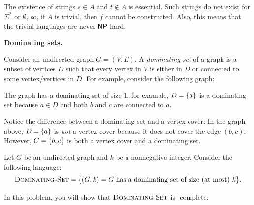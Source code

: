 \documentclass[11pt,addpoints,answers]{exam}
\begin{document}
\begin{questions}
\begin{parts}
\begin{solution}
  The existence of strings \(s\in A\) and \(t\notin A\) is essential. Such strings do not exist for \(\Sigma^*\) or \(\emptyset\), so, if \(A\) is trivial, then \(f\) cannot be constructed. Also, this means that the trivial languages are never \(\mathsf{NP}\)-hard. 
  
  \end{solution}
    
\end{parts}
\pagebreak

  \question \textbf{Dominating sets.} \label{dom-set}
    \newcommand{\DomSet}{\textsc{Dominating-Set}}

    Consider an undirected graph $G = (V,E)$. A \emph{dominating set} of a graph is a subset of vertices $D$ such that every vertex in $V$ is either in $D$ or connected to some vertex/vertices in $D$. For example, consider the following graph:

    \begin{center}
    \end{center}

    The graph has a dominating set of size $1$, for example, $D = \{a\}$ is a dominating set because $a \in D$ and both $b$ and $c$ are connected to $a$. 

    Notice the difference between a dominating set and a vertex cover: In the graph above, $D = \{a\}$ is \emph{not} a vertex cover because it does not cover the edge $(b,c)$. However, $C = \{b,c\}$ is both a vertex cover and a dominating set. 

    Let $G$ be an undirected graph and $k$ be a nonnegative integer. Consider the following language:
    \[
        \DomSet = \set{(G,k) = \text{$G$ has a dominating set of size (at most) $k$}}.
    \]

    In this problem, you will show that $\DomSet$ is \NP-complete.

  \begin{parts}

\end{parts}
\end{questions}
\end{document}
